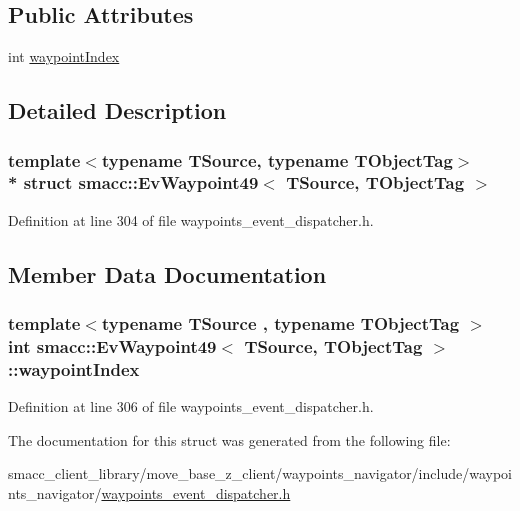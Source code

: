 \subsection*{Public Attributes}
\begin{DoxyCompactItemize}
\item 
int \hyperlink{structsmacc_1_1EvWaypoint49_af19e9ed4a5d022fcfc7b62e52c8b2374}{waypoint\+Index}
\end{DoxyCompactItemize}


\subsection{Detailed Description}
\subsubsection*{template$<$typename T\+Source, typename T\+Object\+Tag$>$\\*
struct smacc\+::\+Ev\+Waypoint49$<$ T\+Source, T\+Object\+Tag $>$}



Definition at line 304 of file waypoints\+\_\+event\+\_\+dispatcher.\+h.



\subsection{Member Data Documentation}
\subsubsection[{\texorpdfstring{waypoint\+Index}{waypointIndex}}]{\setlength{\rightskip}{0pt plus 5cm}template$<$typename T\+Source , typename T\+Object\+Tag $>$ int {\bf smacc\+::\+Ev\+Waypoint49}$<$ T\+Source, T\+Object\+Tag $>$\+::waypoint\+Index}\hypertarget{structsmacc_1_1EvWaypoint49_af19e9ed4a5d022fcfc7b62e52c8b2374}{}\label{structsmacc_1_1EvWaypoint49_af19e9ed4a5d022fcfc7b62e52c8b2374}


Definition at line 306 of file waypoints\+\_\+event\+\_\+dispatcher.\+h.



The documentation for this struct was generated from the following file\+:\begin{DoxyCompactItemize}
\item 
smacc\+\_\+client\+\_\+library/move\+\_\+base\+\_\+z\+\_\+client/waypoints\+\_\+navigator/include/waypoints\+\_\+navigator/\hyperlink{waypoints__event__dispatcher_8h}{waypoints\+\_\+event\+\_\+dispatcher.\+h}\end{DoxyCompactItemize}
